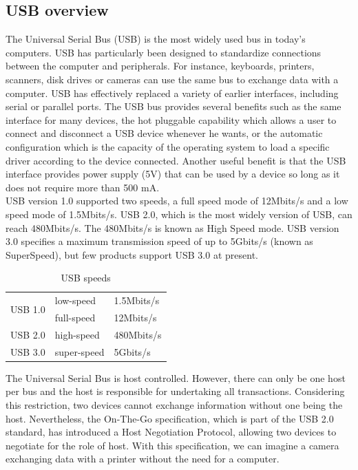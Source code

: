 \documentclass[pdftex,10pt,a4paper]{report}
\begin{document}
\subsection{USB overview}
The Universal Serial Bus (USB) is the most widely used bus in today's computers. USB has particularly been designed to standardize connections between the computer and peripherals. For instance, keyboards, printers, scanners, disk drives or cameras can use the same bus to exchange data with a computer. USB has effectively replaced a variety of earlier interfaces, including serial or parallel ports. The USB bus provides several benefits such as the same interface for many devices, the hot pluggable capability which allows a user to connect and disconnect a USB device whenever he wants, or the automatic configuration which is the capacity of the operating system to load a specific driver according to the device connected. Another useful benefit is that the USB interface provides power supply (5V) that can be used by a device so long as it does not require more than 500 mA.\\

USB version 1.0 supported two speeds, a full speed mode of 12Mbits/s and a low speed mode of 1.5Mbits/s. USB 2.0, which is the most widely version of USB, can reach 480Mbits/s. The 480Mbits/s is known as High Speed mode. USB version 3.0 specifies a maximum transmission speed of up to 5Gbits/s (known as SuperSpeed), but few products support USB 3.0 at present.
\\
\begin{table}[h!]
\begin{center}
\begin{tabular}{|l|l|l|}
\hline
\multirow{2}{*}{USB 1.0} & low-speed & 1.5Mbits/s \\
 & full-speed & 12Mbits/s \\ \hline
USB 2.0 & high-speed & 480Mbits/s \\ \hline
USB 3.0 & super-speed & 5Gbits/s \\ \hline
\end{tabular}
\end{center}
\caption{USB speeds}
\label{USB speeds}
\end{table}

The Universal Serial Bus is host controlled. However, there can only be one host per bus and the host is responsible for undertaking all transactions. Considering this restriction, two devices cannot exchange information without one being the host. Nevertheless, the On-The-Go specification, which is part of the USB 2.0 standard, has introduced a Host Negotiation Protocol, allowing two devices to negotiate for the role of host. With this specification, we can imagine a camera exchanging data with a printer without the need for a computer. 
\end{document}
